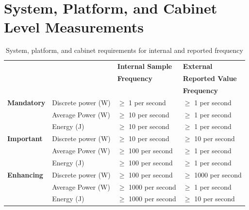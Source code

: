 \section{System, Platform, and Cabinet Level Measurements}

\begin{table}[htbp]
\caption{System, platform, and cabinet requirements for internal and reported frequency}
\label{tab:spclevel}
\begin{tabular}{|p{3.0cm}|p{3.5cm}|p{3.5cm}|p{3.5cm}|} \hline
& & \textbf{Internal Sample}&\textbf{External}\\ 
& & \textbf{Frequency}&\textbf{Reported Value}\\ 
& & & \textbf{Frequency}\\ \hline

\textbf{Mandatory} &
Discrete power (W)&
\mbox{$ \ge $} 1 per second &
\mbox{$ \ge $} 1 per second \\

& 
Average Power (W) &
\mbox{$ \ge $} 10 per second &
\mbox{$ \ge $} 1 per second \\

& 
Energy (J) &
\mbox{$ \ge $} 10 per second &
\mbox{$ \ge $} 1 per second \\ \hline

\textbf{Important} & 
Discrete power (W)&
\mbox{$ \ge $} 10 per second &
\mbox{$ \ge $} 10 per second \\

& 
Average Power (W) &
\mbox{$ \ge $} 100 per second &
\mbox{$ \ge $} 1 per second \\

& 
Energy (J) &
\mbox{$ \ge $} 100 per second &
\mbox{$ \ge $} 1 per second \\ \hline 

\textbf{Enhancing} & 
Discrete power (W)&
\mbox{$ \ge $} 100 per second &
\mbox{$ \ge $} 1000 per second \\

& 
Average Power (W) &
\mbox{$ \ge $} 1000 per second &
\mbox{$ \ge $} 1 per second \\

& 
Energy (J) &
\mbox{$ \ge $} 1000 per second &
\mbox{$ \ge $} 10 per second \\ \hline

\end{tabular}
\end{table}
